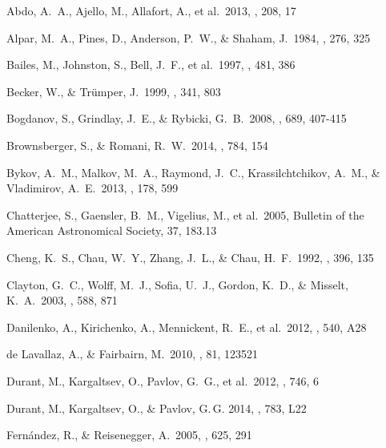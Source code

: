 \documentclass[iop]{emulateapj}
\begin{document}
\begin{thebibliography}{}


 Abdo, A.~A., Ajello, M., Allafort, A., et al.\ 2013, \apjs, 208, 17 

 Alpar, M.~A., Pines, D., Anderson, P.~W., \& Shaham, J.\ 1984, \apj, 276, 325 

 Bailes, M., Johnston, S., Bell, J.~F., et al.\ 1997, \apj, 481, 386 

 Becker, W., \& Tr{\"u}mper, J.\ 1999, \aap, 341, 803 

 Bogdanov, S., Grindlay, J.~E., \& Rybicki, G.~B.\ 2008, \apj, 689, 407-415 

 Brownsberger, S., \& Romani, R.~W.\ 2014, \apj, 784, 154 

 Bykov, A.~M., Malkov, M.~A., Raymond, J.~C., Krassilchtchikov, A.~M., \& Vladimirov, A.~E.\ 2013, \ssr, 178, 599 

 Chatterjee, S., Gaensler, B.~M., Vigelius, M., et al.\ 2005, Bulletin of the American Astronomical Society, 37, 183.13 

 Cheng, K.~S., Chau, W.~Y., Zhang, J.~L., \& Chau, H.~F.\ 1992, \apj, 396, 135 

 Clayton, G.~C., Wolff, M.~J., Sofia, U.~J., Gordon, K.~D., \& Misselt, K.~A.\ 2003, \apj, 588, 871 

 Danilenko, A., Kirichenko, A., Mennickent, R.~E., et al.\ 2012, \aap, 540, A28 

 de Lavallaz, A., \& Fairbairn, M.\ 2010, \prd, 81, 123521 

 Durant, M., Kargaltsev, O., Pavlov, G.~G., et al.\ 2012, \apj, 746, 6 

 Durant, M., Kargaltsev, O., \& Pavlov, G.\,G. 2014, \apj, 783, L22

 Fern{\'a}ndez, R., \& Reisenegger, A.\ 2005, \apj, 625, 291 


\end{thebibliography}
\end{document}
